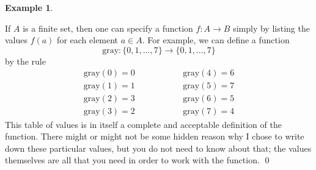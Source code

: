 \documentclass[a4paper]{book}
\newcommand{\xra}       {\xrightarrow}
\renewcommand{\:}{\colon}
\newcommand{\bilabel}[1]{\hypertarget{#1}{\label{#1}}}
\theoremstyle{definition}
\newtheorem{example}[theorem]{Example}
\begin{document}
\begin{example}\bilabel{eg-gray-code}
 If $A$ is a finite set, then one can specify a function $f\:A\xra{}B$
 simply by listing the values $f(a)$ for each element $a\in A$.  For
 example, we can define a function
 \[ \text{gray}\:\{0,1,\ldots,7\}\xra{}\{0,1,\ldots,7\} \]
 by the rule
 \[ \begin{array}{lll}
     \text{gray}(0) = 0 & \hspace{4em} & \text{gray}(4) = 6 \\
     \text{gray}(1) = 1 &              & \text{gray}(5) = 7 \\
     \text{gray}(2) = 3 &              & \text{gray}(6) = 5 \\
     \text{gray}(3) = 2 &              & \text{gray}(7) = 4
    \end{array}
 \]
 This table of values is in itself a complete and acceptable
 definition of the function.  There might or might not be some hidden
 reason why I chose to write down these particular values, but you do
 not need to know about that; the values themselves are all that you
 need in order to work with the function. \qed
\end{example}
\end{document}
